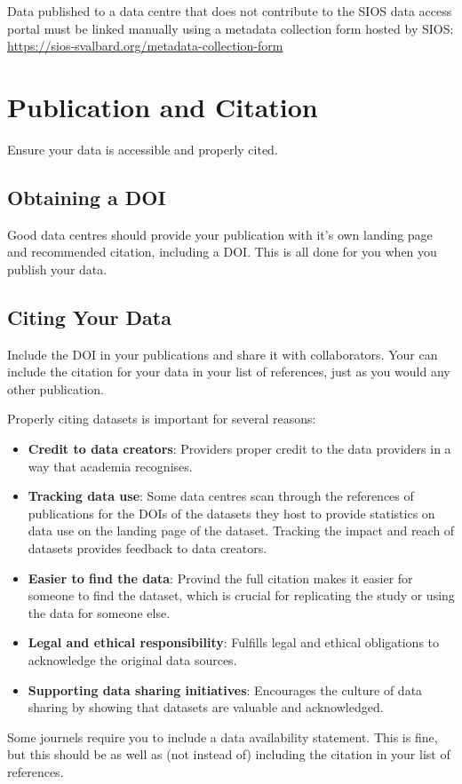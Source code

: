 \documentclass[a4paper,12pt]{article}
\begin{document}
Data published to a data centre that does not contribute to the SIOS data access portal must be linked manually using a metadata collection form hosted by SIOS: \url{https://sios-svalbard.org/metadata-collection-form}

\section{Publication and Citation}
\label{sec:publication-citation}
Ensure your data is accessible and properly cited.

\subsection{Obtaining a DOI}

Good data centres should provide your publication with it's own landing page and recommended citation, including a DOI. This is all done for you when you publish your data.

\subsection{Citing Your Data}

Include the DOI in your publications and share it with collaborators. Your can include the citation for your data in your list of references, just as you would any other publication. 

Properly citing datasets is important for several reasons:
\begin{itemize}
    \item \textbf{Credit to data creators}: Providers proper credit to the data providers in a way that academia recognises. 
    \item \textbf{Tracking data use}: Some data centres scan through the references of publications for the DOIs of the datasets they host to provide statistics on data use on the landing page of the dataset. Tracking the impact and reach of datasets provides feedback to data creators.  
    \item \textbf{Easier to find the data}: Provind the full citation makes it easier for someone to find the dataset, which is crucial for replicating the study or using the data for someone else.
    \item \textbf{Legal and ethical responsibility}: Fulfills legal and ethical obligations to acknowledge the original data sources.
    \item \textbf{Supporting data sharing initiatives}: Encourages the culture of data sharing by showing that datasets are valuable and acknowledged.
\end{itemize}

Some journels require you to include a data availability statement. This is fine, but this should be as well as (not instead of) including the citation in your list of references.



\end{document}
